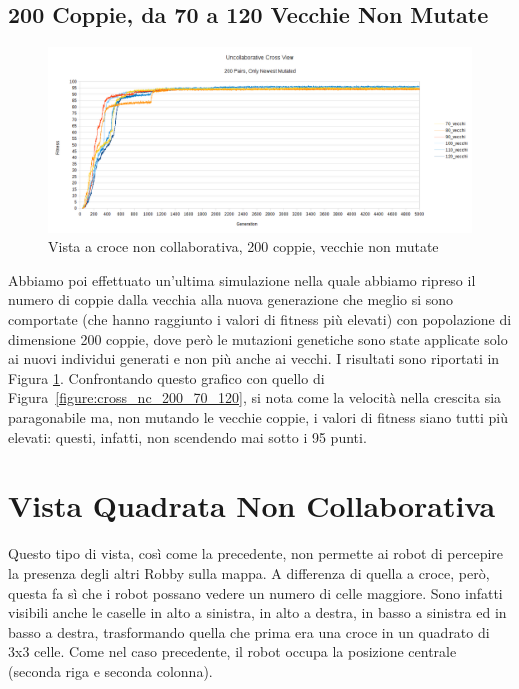 \subsection{200 Coppie, da 70 a 120 Vecchie Non Mutate}
\begin{figure}[ht]
	\centering
	\includegraphics[scale=0.7,angle=90]{imgs/cross_nc_200_pairs_70_120_old_not_mutated.png}
	\caption{Vista a croce non collaborativa, 200 coppie, vecchie non mutate}
	\label{figure:cross_nc_200_70_120_non}
\end{figure}
Abbiamo poi effettuato un'ultima simulazione nella quale abbiamo ripreso il
numero di coppie dalla vecchia alla nuova generazione che meglio si sono
comportate (che hanno raggiunto i valori di fitness più elevati) con popolazione
di dimensione 200 coppie, dove però le mutazioni genetiche sono state applicate
solo ai nuovi individui generati e non più anche ai vecchi.\newline
I risultati sono riportati in Figura
\ref{figure:cross_nc_200_70_120_non}. Confrontando questo grafico con quello di
Figura~\ref{figure:cross_nc_200_70_120}, si nota come la velocità nella crescita
sia paragonabile ma, non mutando le vecchie coppie, i valori di fitness siano
tutti più elevati: questi, infatti, non scendendo mai sotto i 95 punti.



\clearpage



\section{Vista Quadrata Non Collaborativa}
Questo tipo di vista, così come la precedente, non permette ai robot di
percepire la presenza degli altri Robby sulla mappa. A differenza di quella a
croce, però, questa fa sì che i robot possano vedere un numero di celle
maggiore. Sono infatti visibili anche le caselle in alto a sinistra, in alto a
destra, in basso a sinistra ed in basso a destra, trasformando quella che prima
era una croce in un quadrato di 3x3 celle. Come nel caso precedente, il robot
occupa la posizione centrale (seconda riga e seconda colonna).

